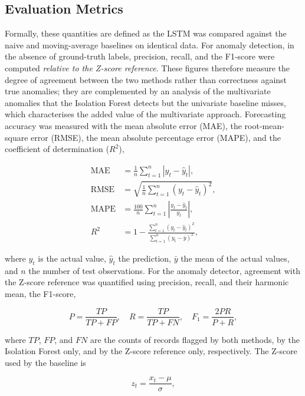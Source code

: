 \documentclass[conference]{IEEEtran}
\begin{document}
\subsection{Evaluation Metrics}
Formally, these quantities are defined as the LSTM was compared against the naive and
moving-average baselines on identical data. For anomaly detection, in the
absence of ground-truth labels, precision, recall, and the F1-score were
computed \emph{relative to the Z-score reference}. These figures therefore
measure the degree of agreement between the two methods rather than correctness
against true anomalies; they are complemented by an analysis of the multivariate
anomalies that the Isolation Forest detects but the univariate baseline misses,
which characterises the added value of the multivariate approach. Forecasting accuracy was measured with the mean absolute error (MAE), the
root-mean-square error (RMSE), the mean absolute percentage error (MAPE), and
the coefficient of determination ($R^2$),
 
\begin{align}
\mathrm{MAE} &= \frac{1}{n}\sum_{t=1}^{n}\left|y_t - \hat{y}_t\right|, \label{eq:mae}\\
\mathrm{RMSE} &= \sqrt{\frac{1}{n}\sum_{t=1}^{n}\left(y_t - \hat{y}_t\right)^2}, \label{eq:rmse}\\
\mathrm{MAPE} &= \frac{100}{n}\sum_{t=1}^{n}\left|\frac{y_t - \hat{y}_t}{y_t}\right|, \label{eq:mape}\\
R^2 &= 1 - \frac{\sum_{t=1}^{n}(y_t-\hat{y}_t)^2}{\sum_{t=1}^{n}(y_t-\bar{y})^2}, \label{eq:r2}
\end{align}
 
where $y_t$ is the actual value, $\hat{y}_t$ the prediction, $\bar{y}$ the mean
of the actual values, and $n$ the number of test observations. For the anomaly
detector, agreement with the Z-score reference was quantified using precision,
recall, and their harmonic mean, the F1-score,
 
\begin{equation}
P = \frac{TP}{TP+FP}, \quad
R = \frac{TP}{TP+FN}, \quad
F_1 = \frac{2PR}{P+R}, \label{eq:prf}
\end{equation}
 
where $TP$, $FP$, and $FN$ are the counts of records flagged by both methods, by
the Isolation Forest only, and by the Z-score reference only, respectively. The
Z-score used by the baseline is
 
\begin{equation}
z_t = \frac{x_t - \mu}{\sigma}, \label{eq:zscore}
\end{equation}
 
\end{document}

